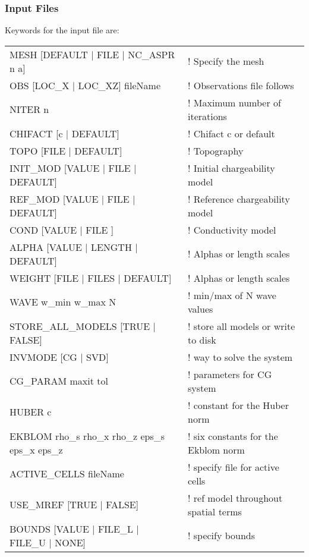 \subsubsection{Input Files}
Keywords for the input file  are:
%
\begin{fileExample}
\begin{tabular}{|ll|}
\hline
MESH [DEFAULT | FILE | NC\_ASPR n a] & ! Specify the mesh \\
OBS [LOC\_X | LOC\_XZ] fileName & ! Observations file follows \\
NITER n & ! Maximum number of iterations \\
CHIFACT [c | DEFAULT] & ! Chifact c or default \\
TOPO [FILE | DEFAULT] & ! Topography \\
INIT\_MOD [VALUE | FILE | DEFAULT] & ! Initial chargeability model \\
REF\_MOD [VALUE | FILE | DEFAULT] & ! Reference chargeability model \\
COND [VALUE | FILE ] & ! Conductivity model \\
ALPHA [VALUE | LENGTH | DEFAULT] & ! Alphas or length scales \\
WEIGHT [FILE | FILES | DEFAULT] & ! Alphas or length scales \\
WAVE w\_min w\_max N & ! min/max of N wave values \\
STORE\_ALL\_MODELS [TRUE | FALSE] & ! store all models or write to disk \\
INVMODE [CG | SVD] & ! way to solve the system \\
CG\_PARAM maxit tol & ! parameters for CG system \\
HUBER c & ! constant for the Huber norm \\
EKBLOM rho\_s rho\_x rho\_z eps\_s eps\_x eps\_z & ! six constants for the Ekblom norm \\
ACTIVE\_CELLS fileName & ! specify file for active cells \\
USE\_MREF [TRUE | FALSE] & ! ref model throughout spatial terms \\
BOUNDS [VALUE | FILE\_L | FILE\_U | NONE] & ! specify bounds\\
\hline
\end{tabular}
\end{fileExample}

